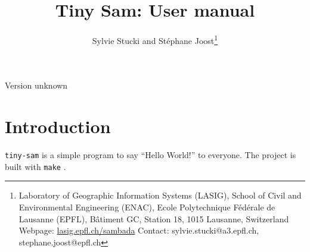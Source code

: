 \documentclass[a4paper,11pt]{article}
\title{Tiny Sam: User manual}
\author{Sylvie Stucki and Stéphane Joost\footnote{
Laboratory of Geographic Information Systems (LASIG), School of Civil and Environmental Engineering (ENAC), Ecole Polytechnique Fédérale de Lausanne (EPFL), Bâtiment GC, Station 18, 1015 Lausanne, Switzerland \newline
Webpage: \protect\url{lasig.epfl.ch/sambada} \newline Contact: sylvie.stucki@a3.epfl.ch, stephane.joost@epfl.ch
}}
\newcommand{\versionnumber}{unknown}
\begin{document}
\maketitle

\vspace{-1.25cm}
\begin{center}
\small Version \versionnumber
\end{center}

\vfill

\tableofcontents

\vfill

\clearpage

\section{Introduction}
\texttt{tiny-sam} is a simple program to say ``Hello World!'' to everyone.
The project is built with \texttt{make} \citep{Mecklenburg:2004aa}.
\printbibliography
\end{document}
